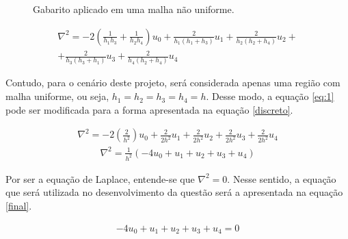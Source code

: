 \documentclass[a4paper,11pt]{article}
\begin{document}
    \begin{figure}[H]
        \centering
        \caption[width=\columnwidth]{Gabarito aplicado em uma malha não uniforme.}
        \label{gabarito}
    \end{figure}
    
    \begin{eqnarray}
        \label{eq:1}
        \nabla^2 = -2(\frac{1}{h_1h_3} + \frac{1}{h_2h_4})u_0 + \frac{2}{h_1(h_1+h_3)}u_1 + \frac{2}{h_2(h_2+h_4)}u_2 +\\\nonumber+ \frac{2}{h_3(h_3+h_1)}u_3 + \frac{2}{h_4(h_2+h_4)}u_4
    \end{eqnarray}

    Contudo, para o cenário deste projeto, será considerada apenas uma região com malha uniforme, ou seja, $h_1=h_2=h_3=h_4=h$. Desse modo, a equação \ref{eq:1} pode ser modificada para a forma apresentada na equação \ref{discreto}.
    
    \begin{eqnarray}
        \nabla^2 = -2(\frac{2}{h^2})u_0 + \frac{2}{2h^2}u_1 + \frac{2}{2h^2}u_2 + \frac{2}{2h^2}u_3 + \frac{2}{2h^2}u_4 \nonumber
    \end{eqnarray}
    \begin{eqnarray}
        \label{discreto}
        \nabla^2 = \frac{1}{h^2}(-4u_0 + u_1 + u_2 + u_3 + u_4)
    \end{eqnarray}
    
    Por ser a equação de Laplace, entende-se que $\nabla^2=0$. Nesse sentido, a equação que será utilizada no desenvolvimento da questão será a apresentada na equação \ref{final}.
    
    \begin{eqnarray}
        \label{final}
        -4u_0 + u_1 + u_2 + u_3 + u_4 = 0
    \end{eqnarray}
    
\end{document}
